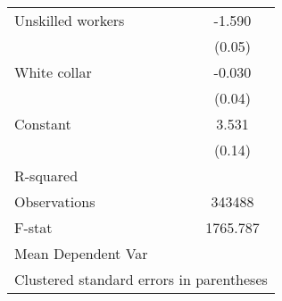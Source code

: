 {\begin{tabular}{l*{1}{c}}
Unskilled workers   &      -1.590\sym{***}\\
                    &      (0.05)         \\
White collar        &      -0.030         \\
                    &      (0.04)         \\
Constant            &       3.531\sym{***}\\
                    &      (0.14)         \\
\hline
R-squared           &                     \\
Observations        &      343488         \\
F-stat              &    1765.787         \\
Mean Dependent Var  &                     \\
\hline\hline
\multicolumn{2}{l}{\footnotesize Clustered standard errors in parentheses}\\
\end{tabular}
}
